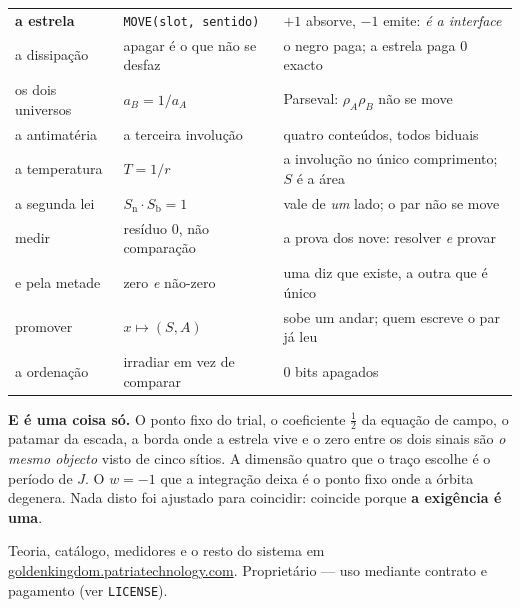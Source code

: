 \documentclass[11pt,a4paper]{article}
\newcommand{\code}[1]{\texttt{\small #1}}
\begin{document}
\begin{center}
\begin{tabular}{@{}p{3.1cm}p{4.4cm}p{7.4cm}@{}}
\textbf{a estrela} & \code{MOVE(slot,\,sentido)} & $+1$ absorve, $-1$ emite: \emph{é a interface} \\
a dissipação & apagar é o que não se desfaz & o negro paga; a estrela paga $0$ exacto \\
os dois universos & $a_B=1/a_A$ & Parseval: $\rho_A\rho_B$ não se move \\
a antimatéria & a terceira involução & quatro conteúdos, todos biduais \\
a temperatura & $T=1/r$ & a involução no único comprimento; $S$ é a área \\
a segunda lei & $S_{\text{n}}\!\cdot\!S_{\text{b}}=1$ & vale de \emph{um} lado; o par não se move \\
medir & resíduo $0$, não comparação & a prova dos nove: resolver \emph{e} provar \\
e pela metade & zero \emph{e} não-zero & uma diz que existe, a outra que é único \\
promover & $x\mapsto(S,A)$ & sobe um andar; quem escreve o par já leu \\
a ordenação & irradiar em vez de comparar & $0$ bits apagados \\
\bottomrule
\end{tabular}
\end{center}

\bigskip
\noindent \textbf{E é uma coisa só.} O ponto fixo do trial, o coeficiente $\tfrac12$ da equação de
campo, o patamar da escada, a borda onde a estrela vive e o zero entre os dois sinais são
\emph{o mesmo objecto} visto de cinco sítios. A dimensão quatro que o traço escolhe é o período de
$J$. O $w=-1$ que a integração deixa é o ponto fixo onde a órbita degenera. Nada disto foi
ajustado para coincidir: coincide porque \textbf{a exigência é uma}.

\vfill
{\footnotesize\color{cinza}\noindent
Teoria, catálogo, medidores e o resto do sistema em
\href{https://goldenkingdom.patriatechnology.com}{goldenkingdom.patriatechnology.com}.
Proprietário --- uso mediante contrato e pagamento (ver \texttt{LICENSE}).\par}
\end{document}
